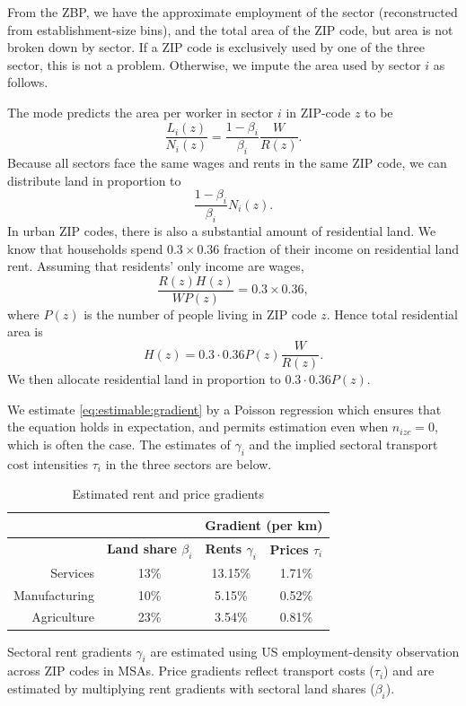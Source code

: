 \documentclass[12pt]{article}
\begin{document}
From the ZBP, we have the approximate employment of the sector (reconstructed from establishment-size bins), and the total area of the ZIP code, but area is not broken down by sector. If a ZIP code is exclusively used by one of the three sector, this is not a problem. Otherwise, we impute the area used by sector $i$ as follows.

The mode predicts the area per worker in sector $i$ in ZIP-code $z$ to be
\[
\frac{L_i(z)}{N_i(z)} = \frac{1-\beta_i}{\beta_i}\frac{W}{R(z)}.
\]
Because all sectors face the same wages and rents in the same ZIP code, we can distribute land in proportion to
\[
\frac{1-\beta_i}{\beta_i}N_i(z).
\]
In urban ZIP codes, there is also a substantial amount of residential land. We know that households spend $0.3\times 0.36$ fraction of their income on residential land rent. Assuming that residents' only income are wages,
\[
\frac{R(z)H(z)}{WP(z)} = 0.3\times 0.36,
\]
where $P(z)$ is the number of people living in ZIP code $z$. Hence total residential area is
\[
H(z) = 0.3\cdot0.36 P(z) \frac{W}{R(z)}.
\]
We then allocate residential land in proportion to $0.3\cdot0.36 P(z)$.

We estimate \eqref{eq:estimable:gradient} by a Poisson regression which ensures that the equation holds in expectation, and permits estimation even when $n_{izc}=0$, which is often the case. The estimates of $\gamma_i$ and the implied sectoral transport cost intensities $\tau_i$ in the three sectors are below.

\begin{table}[h!]
  \begin{center}
  \caption{Estimated rent and price gradients}
    \begin{tabular}{rccc}
    \toprule
    \textbf{} & \textbf{} & \multicolumn{2}{c}{\textbf{Gradient (per km)}}\\
    \midrule
    \textbf{} & \textbf{Land share $\beta_i$ } & \textbf{Rents $\gamma_i$} & \textbf{Prices $\tau_i$} \\
    Services & 13\%  & 13.15\% & 1.71\% \\
    Manufacturing & 10\%  & 5.15\% & 0.52\% \\
    Agriculture & 23\%  & 3.54\% & 0.81\% \\
    \bottomrule
    \end{tabular}%

  \end{center}
  \label{tab:EmpGrad}%

  \noindent \footnotesize{Sectoral rent gradients $\gamma_i$ are estimated using US employment-density observation across ZIP codes in MSAs. Price gradients reflect transport costs ($\tau_i$) and are estimated by multiplying rent gradients with sectoral land shares ($\beta_i$). }
\end{table}%
\end{document}
